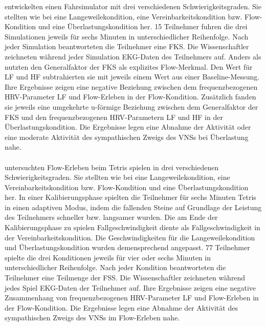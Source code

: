 entwickelten einen Fahrsimulator mit drei verschiedenen Schwierigkeitsgraden. Sie stellten wie bei \citet{Keller2011} eine Langeweilekondition, eine Vereinbarkeitskondition bzw. Flow-Kondition und eine Überlastungskondition her. 15 Teilnehmer fuhren die drei Simulationen jeweils für sechs Minuten in unterschiedlicher Reihenfolge. Nach jeder Simulation beantworteten die Teilnehmer eine \ac{FKS}. Die Wissenschaftler zeichneten während jeder Simulation \ac{EKG}-Daten des Teilnehmers auf. Anders als \citet{Peifer2014} nutzten \citet{Tozman2015} den Generalfaktor der \ac{FKS} als explizites Flow-Merkmal. Den Wert für \acs{LF} und \acs{HF} subtrahierten sie mit jeweils einem Wert aus einer Baseline-Messung. Ihre Ergebnisse zeigen eine negative Beziehung zwischen dem frequenzbezogenen \ac{HRV}-Parameter \acs{LF} und Flow-Erleben in der Flow-Kondition. Zusätzlich fanden sie jeweils eine umgekehrte u-förmige Beziehung zwischen dem Generalfaktor der \ac{FKS} und den frequenzbezogenen \ac{HRV}-Parametern \acs{LF} und \acs{HF} in der Überlastungskondition. Die Ergebnisse legen eine Abnahme der Aktivität oder eine moderate Aktivität des sympathischen Zweigs des \acs{VNS}s bei Überlastung nahe.


\paragraph{\citet{Harmat2015}} 

\label{par:harmat2015}

untersuchten Flow-Erleben beim Tetris spielen in drei verschiedenen Schwierigkeitsgraden. Sie stellten wie bei \citet{Keller2011, Tozman2015} eine Langeweilekondition, eine Vereinbarkeitskondition bzw. Flow-Kondition und eine Überlastungskondition her. In einer Kalibierungsphase spielten die Teilnehmer für sechs Minuten Tetris in einen adaptiven Modus, indem die fallenden Steine auf Grundlage der Leistung des Teilnehmers schneller bzw. langsamer wurden. Die am Ende der Kalibierungsphase zu spielen Fallgeschwindigkeit diente als Fallgeschwindigkeit in der Vereinbarkeitskondition. Die Geschwindigkeiten für die Langeweilekondition und Überlastungskondition wurden demensprechend angepasst. 77 Teilnehmer spielte die drei Konditionen jeweils für vier oder sechs Minuten in unterschiedlicher Reihenfolge. Nach jeder Kondition beantworteten die Teilnehmer eine Teilmenge der \ac{FSS}. Die Wissenschaftler zeichneten während jedes Spiel \ac{EKG}-Daten der Teilnehmer auf. Ihre Ergebnisse zeigen eine negative Zusammenhang von frequenzbezogenen \ac{HRV}-Parameter \acs{LF} und Flow-Erleben in der Flow-Kondition. Die Ergebnisse legen eine Abnahme der Aktivität des sympathischen Zweigs des \acs{VNS}s im Flow-Erleben nahe.

